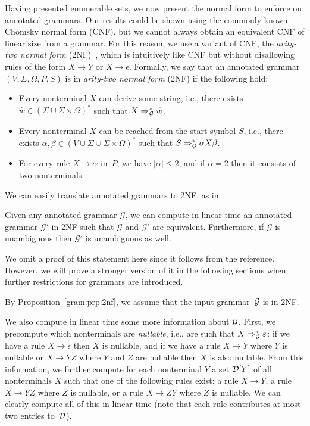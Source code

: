 Having presented enumerable sets, we now present the normal form to
enforce on annotated grammars. Our results could be shown using the
commonly known Chomsky normal form (CNF), but we cannot always obtain
an equivalent CNF of linear size from a grammar. For this
reason, we use a variant of CNF, the
\emph{arity-two normal
form} (2NF)~\cite{lange2009cnf}, which is intuitively like CNF but without
disallowing rules of the form $X \rightarrow Y$ or $X \rightarrow \epsilon$. Formally,
  we say that an annotated grammar $(V, \Sigma, \Omega, P, S)$ is in \emph{arity-two normal
  form} (2NF) if the following hold:
  \begin{itemize}
%
%
\item Every nonterminal $X$ can derive some
string, i.e., there exists $\hat{w}\in (\Sigma \cup \Sigma\times \Omega)^*$
such that $X \Rightarrow_{\mathcal{G}}^* \hat{w}$.
\item Every nonterminal $X$ can be
reached from the start symbol $S$, i.e., there exists $\alpha,\beta \in  (V \cup
\Sigma \cup \Sigma \times \Omega)^*$ such that $S \Rightarrow_{\mathcal{G}}^*
\alpha X \beta$.
%
%
%
%
     \item For every rule $X \rightarrow \alpha$ in~$P$, we have $|\alpha| \leq
       2$, and if $\alpha = 2$ then it consists of two nonterminals.
\end{itemize}

We can easily translate annotated grammars to 2NF, as in~\cite{lange2009cnf}:

\begin{proposition}
  \label{gram:prp:2nf}
  Given any annotated grammar\/ $\mathcal{G}$, we can compute in linear time an annotated
  grammar $\mathcal{G}'$ in 2NF such that $\mathcal{G}$ and $\mathcal{G}'$ are
  equivalent. Furthermore, if $\mathcal{G}$ is unambiguous then $\mathcal{G}'$ is unambiguous as well.
\end{proposition}
We omit a proof of this statement here since it follows from the reference.
However, we will prove a stronger version of it in the following sections when further restrictions for grammars are introduced.

By Proposition~\ref{gram:prp:2nf}, we assume that the 
input grammar~$\mathcal{G}$ is in 2NF.

We also compute in linear time some more information about $\mathcal{G}$. First, we precompute which
nonterminals are \emph{nullable}, i.e., are such that $X \Rightarrow_{\mathcal{G}}^* \varepsilon$: if we have a rule
$X \rightarrow \epsilon$ then $X$ is nullable, and if we have a
rule $X \rightarrow Y$ where $Y$ is nullable or $X \rightarrow YZ$ where $Y$ and
$Z$ are nullable then $X$ is also nullable. From this information, we further
compute for each nonterminal $Y$ a set $\mathcal{D}[Y]$ of all
nonterminals $X$ such that one of the following rules exist: a rule
$X\rightarrow Y$, a rule $X\rightarrow YZ$ where $Z$ is nullable, or a rule $X\rightarrow ZY$ where $Z$ is
nullable. We can clearly compute all of this in linear time (note that each rule contributes at most two
entries to~$\mathcal{D}$).

